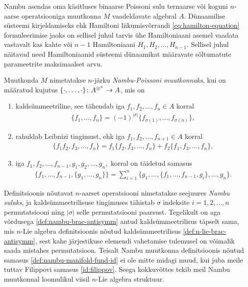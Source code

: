 Nambu asendas oma käsitluses binaarse Poissoni sulu ternaarse või koguni
$n$-aarse operatsiooniga muutkonna $M$ vaadeldavate algebral $A$.
Dünaamilise süsteemi kirjeldamiseks ehk Hamiltoni liikumisvõrrandi
\eqref{eq:hamilton-equation} formuleerimise jaoks on
sellisel juhul tarvis ühe Hamiltoniaani asemel vaadata vastavalt kas kahte
või $n-1$ Hamiltoniaani $H_1, H_2, \dots, H_{n-1}$.
Sellisel juhul näitavad need Hamiltoniaanid süsteemi
dünaamikat määravate sõltumatute parameetrite maksimaalset arvu.

\begin{dfn}
    Muutkonda $M$ nimetatakse $n$-järku \emph{Nambu-Poissoni muutkonnaks},
    kui on määratud kujutus
    $\{\cdot, \dots, \cdot\} \colon A^{\otimes^n} \to A$, mis on
    \begin{enumerate}
        \item kaldsümmeetriline, see tähendab iga $f_1, f_2, \dots, f_n \in A$
            korral
            \begin{align}\label{def:nambu-brac-antisymm}
                \{f_1, \dots, f_n\} = (-1)^{|\sigma|}
                \{f_{\sigma(1)}, \dots, f_{\sigma(n)}\},
            \end{align}
        \item rahuldab Leibnizi tingimust, ehk iga
            $f_1, f_2, \dots, f_{n+1} \in A$ korral
            \begin{align}
                \{f_1 f_2, f_3, \dots, f_n\} =
                f_1 \{f_2, f_3, \dots, f_n\} +
                f_2 \{f_1, f_3, \dots, f_n\},
            \end{align}
        \item iga $f_1, f_2, \dots, f_{n-1}, g_1, g_2, \dots, g_n,$ korral on
        täidetud samasus
            \begin{align}\label{def:nambu-manifold-fund-id}
                \{f_1, \dots, f_{n-1}, \{g_1, \dots, g_n\}\} =
                \sum_{i=1}^{n} \{
                    g_1, \dots, \{f_1, \dots, f_{n-1}, g_i\}, \dots, g_n
                \}.
            \end{align}
    \end{enumerate}
\end{dfn}

Definitsioonis nõutavat $n$-aarset operatsiooni nimetatakse seejuures
\emph{Nambu suluks}, ja kaldsümmeetrilisuse tingimuses tähistab
$\sigma$ indeksite $i = 1, 2, \dots, n$ permutatsiooni ning
$|\sigma|$ selle permutatsiooni paarsust. Tegelikult on
aga võrdusega \eqref{def:nambu-brac-antisymm} antud kaldsümmeetrilisus
täpselt sama, mis $n$-Lie algebra definitsioonis nõutud kaldsümmeetrilisus
\eqref{def:n-lie-brac-antisymm}, sest kahe järjestikuse elemendi vahetamise
tulemusel on võimalik saada mistahes permutatsioon. Teisalt Nambu
muutkonna definitsioonis nõutud samasus \eqref{def:nambu-manifold-fund-id}
ei ole mitte midagi muud, kui juba meile tuttav Filippovi samasus
\eqref{id:filippov}. Seega kokkuvõttes tekib meil Nambu muutkonnal
loomulikul viisil $n$-Lie algebra struktuur.

